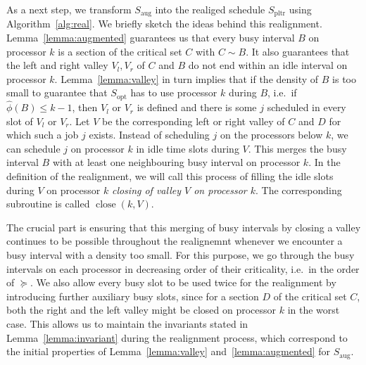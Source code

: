 \documentclass[a4paper]{article}
\DeclareMathOperator{\opt}{opt}
\DeclareMathOperator{\pltr}{pltr}
\DeclareMathOperator{\aug}{aug}
\DeclareMathOperator{\close}{close}
\begin{document}
As a next step, we transform $S_{\aug}$ into the realiged schedule $S_{\pltr}$ using Algorithm~\ref{alg:real}. We briefly sketch the ideas behind this realignment.
Lemma~\ref{lemma:augmented} guarantees us that every busy interval $B$ on processor $k$ is a section of the critical set $C$ with $C \sim B$.
It also guarantees that the left and right valley $V_l, V_r$ of $C$ and $B$ do not end within an idle interval on processor $k$.
Lemma~\ref{lemma:valley} in turn implies that if the density of $B$ is too small to guarantee that $S_{\opt}$ has to use processor $k$ during $B$, i.e.\ if $\hat \phi(B) \leq k - 1$, then $V_l$ or $V_r$ is defined and there is some $j$ scheduled in every slot of $V_l$ or $V_r$.
Let $V$ be the corresponding left or right valley of $C$ and $D$ for which such a job $j$ exists.
Instead of scheduling $j$ on the processors below $k$, we can schedule $j$ on processor $k$ in idle time slots during $V$.
This merges the busy interval $B$ with at least one neighbouring busy interval on processor $k$.
In the definition of the realignment, we will call this process of filling the idle slots during $V$ on processor $k$ \emph{closing of valley $V$ on processor $k$}.
The corresponding subroutine is called $\close(k, V)$.

The crucial part is ensuring that this merging of busy intervals by closing a valley continues to be possible throughout the realignemnt whenever we encounter a busy interval with a density too small.
For this purpose, we go through the busy intervals on each processor in decreasing order of their criticality, i.e.\ in the order of $\succeq$.
We also allow every busy slot to be used twice for the realignment by introducing further auxiliary busy slots, since for a section $D$ of the critical set $C$, both the right and the left valley might be closed on processor $k$ in the worst case.
This allows us to maintain the invariants stated in Lemma~\ref{lemma:invariant} during the realignment process, which correspond to the initial properties of Lemma~\ref{lemma:valley} and~\ref{lemma:augmented} for $S_{\aug}$.
\end{document}
